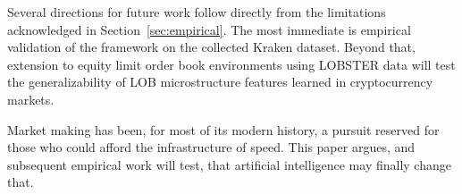 \documentclass[12pt]{article}
\begin{document}
Several directions for future work follow directly from the limitations acknowledged in Section~\ref{sec:empirical}. The most immediate is empirical validation of the framework on the collected Kraken dataset. Beyond that, extension to equity limit order book environments using LOBSTER data will test the generalizability of LOB microstructure features learned in cryptocurrency markets.

Market making has been, for most of its modern history, a pursuit reserved for those who could afford the infrastructure of speed. This paper argues, and subsequent empirical work will test, that artificial intelligence may finally change that.



\end{document}
